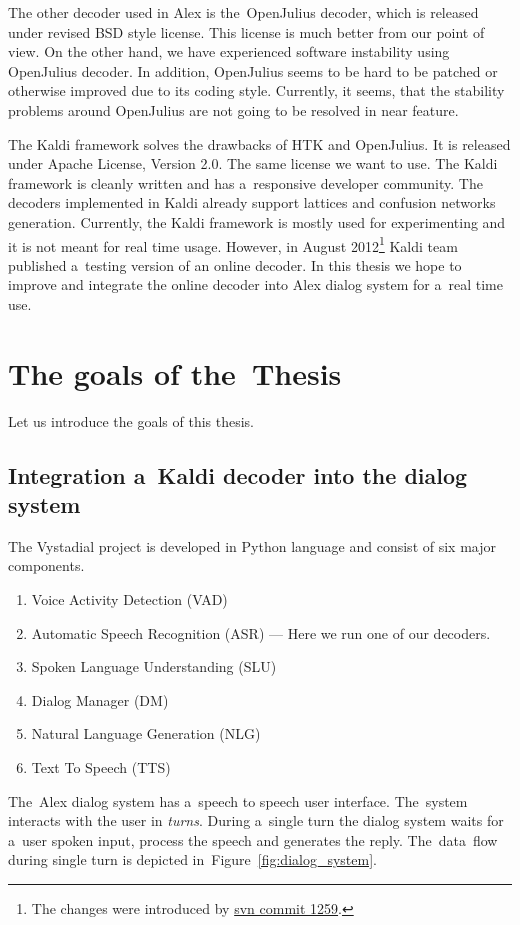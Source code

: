 The other decoder used in Alex is the~OpenJulius decoder, which is released under revised BSD style license. This license is much better from our point of view. On the other hand, we have experienced software instability using OpenJulius decoder. In addition, OpenJulius seems to be hard to be patched or otherwise improved due to its coding style. Currently, it seems, that the stability problems around OpenJulius are not going to be resolved in near feature.

The Kaldi framework solves the drawbacks of HTK and OpenJulius. It is released under Apache License, Version 2.0. The same license we want to use. The Kaldi framework is cleanly written and has a~responsive developer community. The decoders implemented in Kaldi already support lattices and confusion networks generation. Currently, the Kaldi framework is mostly used for experimenting and it is not meant for real time usage. However, in August 2012\footnote{The changes were introduced by \href{https://sourceforge.net/p/kaldi/code/1259/}{svn commit 1259}.} Kaldi team published a~testing version of an online decoder. In this thesis we hope to improve and integrate the online decoder into Alex dialog system for a~real time use.


\section{The goals of the~Thesis} 
\label{sec:goals}
Let us introduce the goals of this thesis.

\subsection{Integration a~Kaldi decoder into the dialog system} 
\label{sub:integration}
The Vystadial project is developed in Python language and consist of six major components. 
\begin{enumerate}
    \item Voice Activity Detection (VAD)
    \item Automatic Speech Recognition (ASR) --- Here we run one of our decoders.
    \item Spoken Language Understanding (SLU)
    \item Dialog Manager (DM)
    \item Natural Language Generation (NLG)
    \item Text To Speech (TTS)
\end{enumerate}
The~Alex dialog system has a~speech to speech user interface. The~system interacts with the user in {\it turns}. During a~single turn the dialog system waits for a~user spoken input, process the speech and generates the reply.
The~data~flow during single turn is depicted in~Figure~\ref{fig:dialog_system}.

